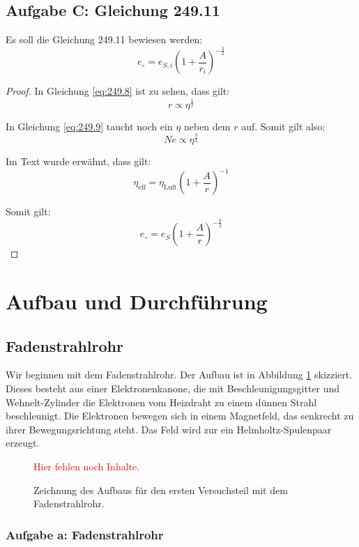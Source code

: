 \documentclass[11pt]{article}
\newcommand{\fehlt}{\textcolor{red}{Hier fehlen noch Inhalte.}}
\begin{document}
\subsection{Aufgabe C: Gleichung 249.11}

Es soll die Gleichung 249.11 bewiesen werden:
\[ e_\circ = e_{S, i} \left( 1 + \frac A{r_i} \right)^{-\frac 32} \]

\begin{proof}
	In Gleichung \eqref{eq:249.8} ist zu sehen, dass gilt:
	\[ r \propto \eta^{\frac 12} \]

	In Gleichung \eqref{eq:249.9} taucht noch ein $\eta$ neben dem $r$ auf.
	Somit gilt also:
	\[ N e \propto \eta^{\frac 32} \]

	Im Text wurde erwähnt, dass gilt:
	\[ \eta_\text{eff} = \eta_\text{Luft} \left( 1 + \frac Ar \right)^{-1} \]

	Somit gilt:
	\[ e_\circ = e_S \left( 1 + \frac Ar \right)^{-\frac 32} \]
\end{proof}


\section{Aufbau und Durchführung}

\subsection{Fadenstrahlrohr}

Wir beginnen mit dem Fadenstrahlrohr. Der Aufbau ist in Abbildung
\ref{fig:Fadenstrahlrohr} skizziert. Dieses besteht aus einer Elektronenkanone,
die mit Beschleunigungsgitter und Wehnelt-Zylinder die Elektronen vom Heizdraht
zu einem dünnen Strahl beschleunigt. Die Elektronen bewegen sich in einem
Magnetfeld, das senkrecht zu ihrer Bewegungsrichtung steht. Das Feld wird zur
ein Helmholtz-Spulenpaar erzeugt.

\begin{figure}[h!]
	\centering
	\fehlt
	\caption{Zeichnung des Aufbaus für den ersten Versuchsteil mit dem Fadenstrahlrohr.}
	\label{fig:Fadenstrahlrohr}
\end{figure}

\subsubsection{Aufgabe a: Fadenstrahlrohr}
\end{document}

